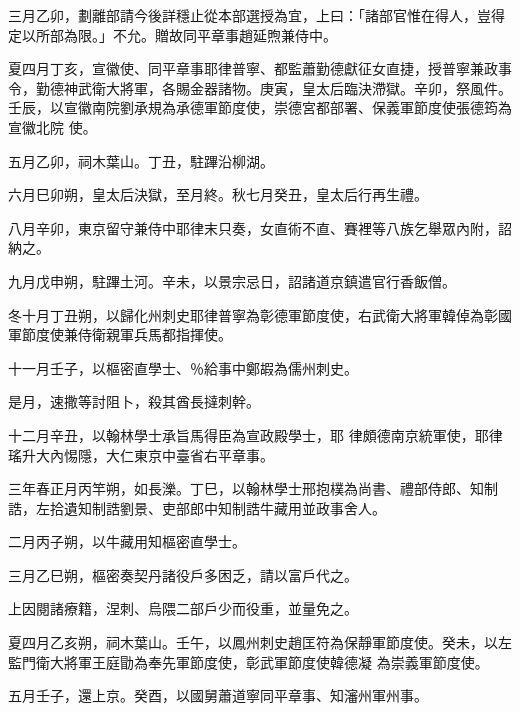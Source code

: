 \begin{pinyinscope}
 三月乙卯，劃離部請今後詳穩止從本部選授為宜，上曰：「諸部官惟在得人，豈得定以所部為限。」不允。贈故同平章事趙延煦兼侍中。



 夏四月丁亥，宣徽使、同平章事耶律普寧、都監蕭勤德獻征女直捷，授普寧兼政事令，勤德神武衛大將軍，各賜金器諸物。庚寅，皇太后臨決滯獄。辛卯，祭風件。壬辰，以宣徽南院劉承規為承德軍節度使，崇德宮都部署、保義軍節度使張德筠為宣徽北院
 使。



 五月乙卯，祠木葉山。丁丑，駐蹕沿柳湖。



 六月巳卯朔，皇太后決獄，至月終。秋七月癸丑，皇太后行再生禮。



 八月辛卯，東京留守兼侍中耶律末只奏，女直術不直、賽裡等八族乞舉眾內附，詔納之。



 九月戊申朔，駐蹕土河。辛未，以景宗忌日，詔諸道京鎮遣官行香飯僧。



 冬十月丁丑朔，以歸化州刺史耶律普寧為彰德軍節度使，右武衛大將軍韓倬為彰國軍節度使兼侍衛親軍兵馬都指揮使。



 十一月壬子，以樞密直學士、％給事中鄭嘏為儒州刺史。



 是月，速撒等討阻卜，殺其酋長撻刺幹。



 十二月辛丑，以翰林學士承旨馬得臣為宣政殿學士，耶
 律頗德南京統軍使，耶律瑤升大內惕隱，大仁東京中臺省右平章事。



 三年春正月丙竿朔，如長濼。丁巳，以翰林學士邢抱樸為尚書、禮部侍郎、知制誥，左拾遺知制誥劉景、吏部郎中知制誥牛藏用並政事舍人。



 二月丙子朔，以牛藏用知樞密直學士。



 三月乙巳朔，樞密奏契丹諸役戶多困乏，請以富戶代之。



 上因閱諸療籍，涅刺、烏隈二部戶少而役重，並量免之。



 夏四月乙亥朔，祠木葉山。壬午，以鳳州刺史趙匡符為保靜軍節度使。癸未，以左監門衛大將軍王庭勖為奉先軍節度使，彰武軍節度使韓德凝
 為崇義軍節度使。



 五月壬子，還上京。癸酉，以國舅蕭道寧同平章事、知瀋州軍州事。




\end{pinyinscope}
